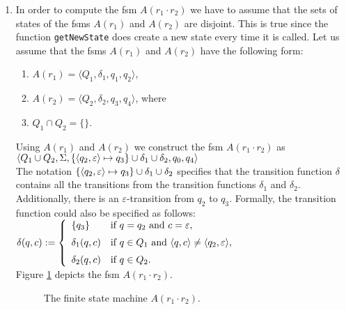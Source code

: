 \begin{enumerate}
\item In order to compute the fsm $A(r_1 \cdot r_2)$ 
      we have to assume that the sets of states of the fsms
      $A(r_1)$ and $A(r_2)$ are disjoint.  This is true since the function \texttt{getNewState} does
      create a new state every time it is called.
      Let us assume that the fsms  $A(r_1)$ and $A(r_2)$ have the following form:
      \begin{enumerate}
      \item $A(r_1) = \langle Q_1, \delta_1, q_1, q_2 \rangle$,
      \item $A(r_2) = \langle Q_2, \delta_2, q_3, q_4 \rangle$, \quad where
      \item $Q_1 \cap Q_2 = \{\}$.
      \end{enumerate}
      Using $A(r_1)$ and $A(r_2)$ we construct the fsm $A(r_1 \cdot r_2)$ as
      \\[0.2cm]
      \hspace*{0.8cm}
       $\langle Q_1 \cup Q_2, \Sigma, 
                \{ \pair(q_2,\varepsilon) \mapsto q_3 \} 
                   \cup \delta_1 \cup \delta_2, q_0, q_4 \rangle$
      \\[0.2cm]
      The notation $\{ \pair(q_2,\varepsilon) \mapsto q_3 \} \cup \delta_1 \cup \delta_2$
      specifies that the transition function $\delta$ contains all the transitions
      from the transition functions  $\delta_1$ and $\delta_2$.  Additionally,
      there is an  $\varepsilon$-transition from $q_2$ to
      $q_3$.  Formally, the transition function could also be specified as follows:
      \\[0.2cm]
      \hspace*{1.3cm}
      $\delta(q,c) := \left\{
      \begin{array}{ll}
        \{ q_3 \}       & \mbox{if $q = q_2$ and $c = \varepsilon$}, \\[0.2cm]
        \delta_1(q, c)  & \mbox{if $q \in Q_1$ and $\pair(q,c) \not= \pair(q_2,\varepsilon)$}, \\[0.2cm]
        \delta_2(q, c)  & \mbox{if $q \in Q_2$.} 
      \end{array}\right.
      $
      \\[0.2cm]
      Figure \ref{fig:aConcat.eps} depicts the fsm $A(r_1 \cdot r_2)$.
      
      \begin{figure}[!ht]
        \centering
      \caption{The finite state machine $A(r_1 \cdot r_2)$.}
      \label{fig:aConcat.eps}
      \end{figure}


\end{enumerate}
